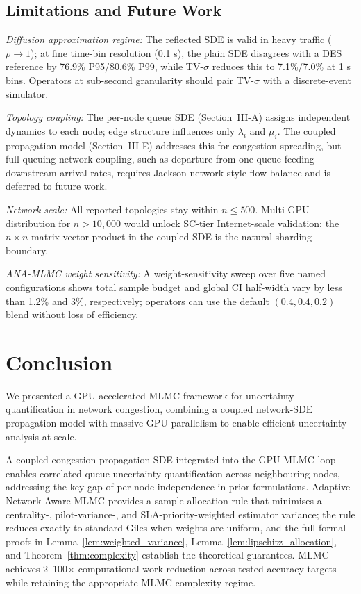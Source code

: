 \documentclass[journal]{IEEEtran}
\begin{document}
\subsection{Limitations and Future Work}
\label{subsec:limitations}

\textit{Diffusion approximation regime:}
The reflected SDE is valid in heavy traffic ($\rho\to1$); at fine time-bin resolution (0.1 s),
the plain SDE disagrees with a DES reference by 76.9\% P95/80.6\% P99, while TV-$\sigma$
reduces this to 7.1\%/7.0\% at 1 s bins. Operators at sub-second granularity should pair
TV-$\sigma$ with a discrete-event simulator.

\textit{Topology coupling:}
The per-node queue SDE (Section~III-A) assigns independent dynamics to each node; edge structure
influences only $\lambda_i$ and $\mu_i$. The coupled propagation model (Section~III-E) addresses
this for congestion spreading, but full queuing-network coupling, such as departure from one
queue feeding downstream arrival rates, requires Jackson-network-style flow balance and is
deferred to future work.

\textit{Network scale:}
All reported topologies stay within $n\leq500$. Multi-GPU distribution for $n>10{,}000$ would
unlock SC-tier Internet-scale validation; the $n\times n$ matrix-vector product in the coupled
SDE is the natural sharding boundary.

\textit{ANA-MLMC weight sensitivity:}
A weight-sensitivity sweep over five named configurations shows total sample budget and global
CI half-width vary by less than 1.2\% and 3\%, respectively; operators can use the default
$(0.4,0.4,0.2)$ blend without loss of efficiency.

\section{Conclusion}

We presented a GPU-accelerated MLMC framework for uncertainty quantification in network
congestion, combining a coupled network-SDE propagation model with massive GPU parallelism to
enable efficient uncertainty analysis at scale.

A coupled congestion propagation SDE integrated into the GPU-MLMC loop enables correlated queue
uncertainty quantification across neighbouring nodes, addressing the key gap of per-node
independence in prior formulations. Adaptive Network-Aware MLMC provides a sample-allocation
rule that minimises a centrality-, pilot-variance-, and SLA-priority-weighted estimator
variance; the rule reduces exactly to standard Giles when weights are uniform, and the full
formal proofs in Lemma~\ref{lem:weighted_variance}, Lemma~\ref{lem:lipschitz_allocation}, and
Theorem~\ref{thm:complexity} establish the theoretical guarantees. MLMC achieves
2--100$\times$ computational work reduction across tested accuracy targets while retaining
the appropriate MLMC complexity regime.
\end{document}
